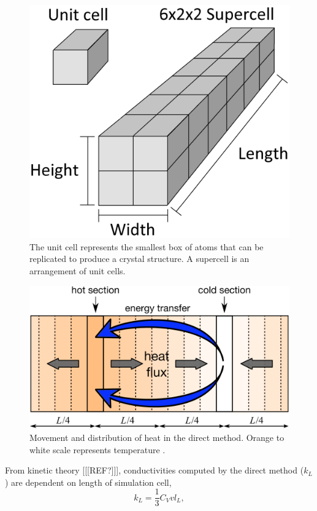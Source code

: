 \begin{figure}[h]
  \includegraphics[width=\linewidth]{Figures/cell_diagram.png}
  \caption{The unit cell represents the smallest box of atoms that can be replicated to produce a crystal structure. A supercell is an arrangement of unit cells.}
  \label{fig:cell_dia}
\end{figure}

\begin{figure}[h]
  \includegraphics[width=\linewidth]{Figures/ss_direct_mod.png}
  \caption{Movement and distribution of heat in the direct method. Orange to white scale represents temperature \citep[modified from][]{Stackhouse2015}.}
  \label{fig:ss_direct}
\end{figure}

From kinetic theory [[[REF?]]], conductivities computed by the direct method ($k_L$) are dependent on length of simulation cell,
\begin{equation}
k_{L} = \frac{1}{3} C_{V} v l_{L} \label{length-dep},
\end{equation}

